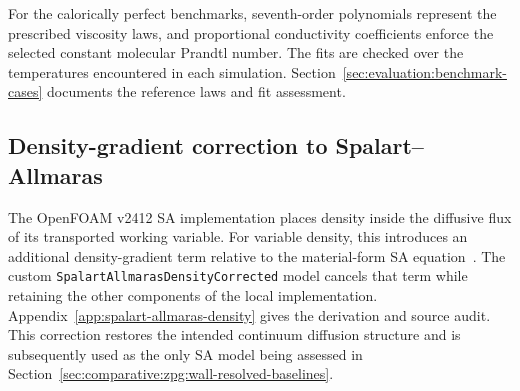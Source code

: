 For the calorically perfect benchmarks, seventh-order polynomials represent
the prescribed viscosity laws, and proportional conductivity coefficients
enforce the selected constant molecular Prandtl number. The fits are checked
over the temperatures encountered in each simulation.
Section~\ref{sec:evaluation:benchmark-cases} documents the reference laws
and fit assessment.

\subsection{Density-gradient correction to Spalart--Allmaras}
\label{subsec:ext:spalart-allmaras-of-correction}

The OpenFOAM v2412 SA implementation places density inside the diffusive
flux of its transported working variable. For variable density, this
introduces an additional density-gradient term relative to the
material-form SA equation~\cite{SpalartAllmaras1994,AJS2012}.
The custom \texttt{SpalartAllmarasDensityCorrected} model cancels that term
while retaining the other components of the local implementation.
Appendix~\ref{app:spalart-allmaras-density} gives the derivation and source
audit. This correction restores the intended continuum diffusion structure and is subsequently used as the only SA model being assessed in Section~\ref{sec:comparative:zpg:wall-resolved-baselines}.